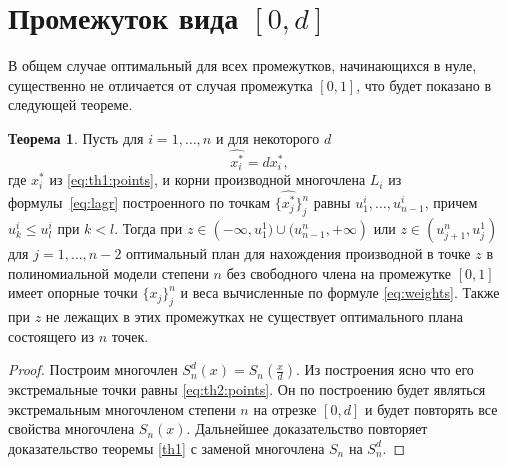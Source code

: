 \documentclass[specialist,
               substylefile = spbu.rtx,
               subf,href,colorlinks=true, 12pt]{disser}
\theoremstyle{definition}
\newtheorem{theorem}{Теорема}
\begin{document}
	\section{Промежуток вида $[0, d]$}
	
	В общем случае оптимальный для всех промежутков, начинающихся в нуле, существенно не отличается от случая промежутка $[0, 1]$, что будет показано в следующей теореме.
	
	\begin{theorem}
		Пусть для $i = 1, \ldots, n$ и для некоторого $d$
		\begin{equation}
			\label{eq:th2:points}
			\widehat{x_i^*} = d x_i^* ,
		\end{equation}
		где $x_i^*$ из \eqref{eq:th1:points}, и корни производной многочлена $L_i$ из формулы~\eqref{eq:lagr} построенного по точкам $\{\widehat{x_j^*}\}_j^n$ равны $u_1^i, \ldots, u_{n-1}^i$, причем $u_k^i \leqslant u_l^i$ при $k < l$. Тогда при $z \in \left(-\infty, u_1^1) \cup (u_{n-1}^n, +\infty \right)$ или $z \in (u_{j+1}^n, u_{j}^1)$ для $j=1, \ldots, n-2$ оптимальный план для нахождения производной в точке $z$ в полиномиальной модели степени $n$ без свободного члена на промежутке $[0, 1]$ имеет опорные точки $\{x_j\}_j^n$ и веса вычисленные по формуле \eqref{eq:weights}. Также при $z$ не лежащих в этих промежутках не существует оптимального плана состоящего из $n$ точек.
	\end{theorem}
	
	\begin{proof}
		Построим многочлен $S_n^d(x) = S_n(\frac{x}{d})$. Из построения ясно что его экстремальные точки равны \eqref{eq:th2:points}. Он по построению будет являться экстремальным многочленом степени $n$ на отрезке $[0, d]$ и будет повторять все свойства многочлена $S_n(x)$. Дальнейшее доказательство повторяет доказательство теоремы \ref{th1} с заменой многочлена $S_n$ на $S_n^d$.
	\end{proof}	
	
	

	
	\nocite{*}
	
	
	
\end{document}
